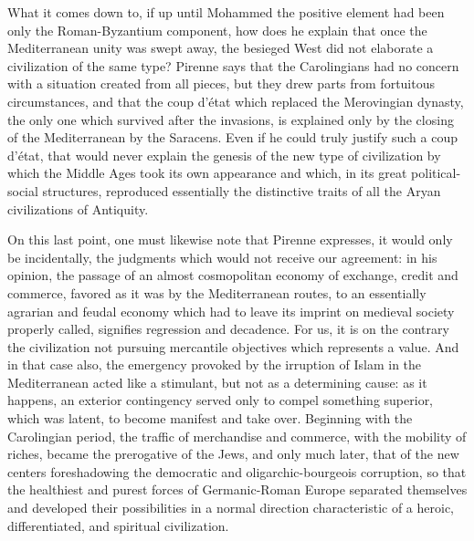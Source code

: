 What it comes down to, if up until Mohammed the positive element had been only the Roman-Byzantium component, how does he explain that once the Mediterranean unity was swept away, the besieged West did not elaborate a civilization of the same type? Pirenne says that the Carolingians had no concern with a situation created from all pieces, but they drew parts from fortuitous circumstances, and that the coup d'état which replaced the Merovingian dynasty, the only one which survived after the invasions, is explained only by the closing of the Mediterranean by the Saracens. Even if he could truly justify such a coup d'état, that would never explain the genesis of the new type of civilization by which the Middle Ages took its own appearance and which, in its great political-social structures, reproduced essentially the distinctive traits of all the Aryan civilizations of Antiquity.

On this last point, one must likewise note that Pirenne expresses, it would only be incidentally, the judgments which would not receive our agreement: in his opinion, the passage of an almost cosmopolitan economy of exchange, credit and commerce, favored as it was by the Mediterranean routes, to an essentially agrarian and feudal economy which had to leave its imprint on medieval society properly called, signifies regression and decadence. For us, it is on the contrary the civilization not pursuing mercantile objectives which represents a value. And in that case also, the emergency provoked by the irruption of Islam in the Mediterranean acted like a stimulant, but not as a determining cause: as it happens, an exterior contingency served only to compel something superior, which was latent, to become manifest and take over. Beginning with the Carolingian period, the traffic of merchandise and commerce, with the mobility of riches, became the prerogative of the Jews, and only much later, that of the new centers foreshadowing the democratic and oligarchic-bourgeois corruption, so that the healthiest and purest forces of Germanic-Roman Europe separated themselves and developed their possibilities in a normal direction characteristic of a heroic, differentiated, and spiritual civilization.



